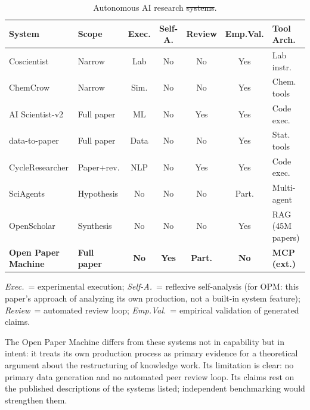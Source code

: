\documentclass{article}
\providecommand{\DIFaddtex}[1]{{\protect\color{blue}\uwave{#1}}} %
\providecommand{\DIFdeltex}[1]{{\protect\color{red}\sout{#1}}}                      %
\providecommand{\DIFaddFL}[1]{\DIFadd{#1}} %
\providecommand{\DIFdelFL}[1]{\DIFdel{#1}} %
\providecommand{\DIFaddbeginFL}{} %
\providecommand{\DIFaddendFL}{} %
\providecommand{\DIFdelbeginFL}{} %
\providecommand{\DIFdelendFL}{} %
\providecommand{\DIFadd}[1]{\texorpdfstring{\DIFaddtex{#1}}{#1}} %
\providecommand{\DIFdel}[1]{\texorpdfstring{\DIFdeltex{#1}}{}} %
\newcommand{\DIFscaledelfig}{0.5}
\newlength{\DIFdelgraphicswidth} %
\newlength{\DIFdelgraphicsheight} %
\newcommand{\DIFaddincludegraphics}[2][]{{\color{blue}\fbox{\DIFOincludegraphics[#1]{#2}}}} %
\newcommand{\DIFdelincludegraphics}[2][]{%
\sbox{\DIFdelgraphicsbox}{\DIFOincludegraphics[#1]{#2}}%
\settoboxwidth{\DIFdelgraphicswidth}{\DIFdelgraphicsbox} %
\settoboxtotalheight{\DIFdelgraphicsheight}{\DIFdelgraphicsbox} %
\scalebox{\DIFscaledelfig}{%
\parbox[b]{\DIFdelgraphicswidth}{\usebox{\DIFdelgraphicsbox}\\[-\baselineskip] \rule{\DIFdelgraphicswidth}{0em}}\llap{\resizebox{\DIFdelgraphicswidth}{\DIFdelgraphicsheight}{%
\setlength{\unitlength}{\DIFdelgraphicswidth}%
\begin{picture}(1,1)%
\thicklines\linethickness{2pt} %
{\color[rgb]{1,0,0}\put(0,0){\framebox(1,1){}}}%
{\color[rgb]{1,0,0}\put(0,0){\line( 1,1){1}}}%
{\color[rgb]{1,0,0}\put(0,1){\line(1,-1){1}}}%
\end{picture}%
}\hspace*{3pt}}} %
} %
\DeclareRobustCommand{\DIFaddbeginFL}{\DIFOaddbeginFL \let\includegraphics\DIFaddincludegraphics} %
\DeclareRobustCommand{\DIFaddendFL}{\DIFOaddendFL \let\includegraphics\DIFOincludegraphics} %
\DeclareRobustCommand{\DIFdelbeginFL}{\DIFOdelbeginFL \let\includegraphics\DIFdelincludegraphics} %
\DeclareRobustCommand{\DIFdelendFL}{\DIFOaddendFL \let\includegraphics\DIFOincludegraphics} %
\begin{document}
\begin{table}[ht]
\centering
\small
\caption{Autonomous AI research \DIFdelbeginFL \DIFdelFL{systems}\DIFdelendFL \DIFaddbeginFL \DIFaddFL{agents}\DIFaddendFL .}
\label{tab:systems}
\begin{tabularx}{\textwidth}{@{} >{\raggedright\arraybackslash}X l c c c c >{\raggedright\arraybackslash}p{2.2cm} @{}}
\toprule
\textbf{System} & \textbf{Scope} & \textbf{Exec.} & \textbf{Self-A.} & \textbf{Review} & \textbf{Emp.Val.} & \textbf{Tool Arch.} \\
\midrule
Coscientist \citep{boiko2023autonomous} & Narrow & Lab & No & No & Yes & Lab instr. \\
ChemCrow \citep{bran2024chemistry} & Narrow & Sim. & No & No & Yes & Chem. tools \\
AI Scientist-v2 \citep{yamada2025scientist} & Full paper & ML & No & Yes & Yes & Code exec. \\
data-to-paper \citep{ifargan2024autonomous} & Full paper & Data & No & No & Yes & Stat. tools \\
CycleResearcher \citep{weng2024cycleresearcher} & Paper+rev. & NLP & No & Yes & Yes & Code exec. \\
SciAgents \citep{ghafarollahi2024sciagents} & Hypothesis & No & No & No & Part. & Multi-agent \\
OpenScholar \citep{asai2024openscholar} & Synthesis & No & No & No & Yes & RAG (45M papers) \\
\textbf{Open Paper Machine} & \textbf{Full paper} & \textbf{No} & \textbf{Yes} & \textbf{Part.} & \textbf{No} & \textbf{MCP (ext.)} \\
\bottomrule
\end{tabularx}

\vspace{0.5em}
\footnotesize\noindent\textit{Exec.}~= experimental execution; \textit{Self-A.}~= reflexive self-analysis (for OPM: this paper's approach of analyzing its own production, not a built-in system feature); \textit{Review}~= automated review loop; \textit{Emp.Val.}~= empirical validation of generated claims.
\end{table}

The Open Paper Machine differs from these systems not in capability but in intent: it treats its own production process as primary evidence for a theoretical argument about the restructuring of knowledge work. Its limitation is clear: no primary data generation and no automated peer review loop. Its claims rest on the published descriptions of the systems listed; independent benchmarking would strengthen them.
\end{document}

